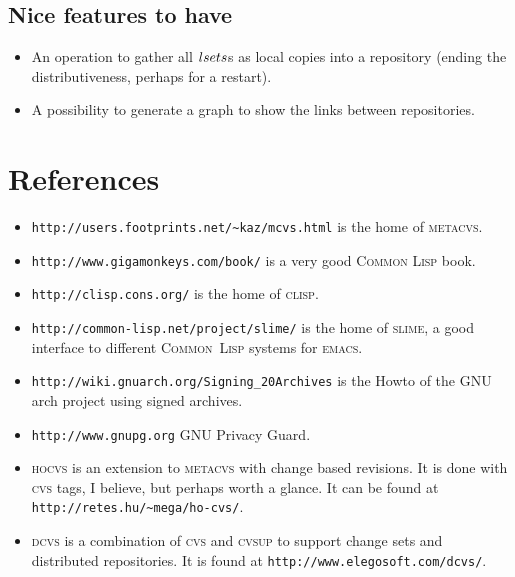 \documentclass[fleqn, 10pt, a4paper]{article}
\begin{document}
\subsection{Nice features to have}

\begin{itemize}
\item An operation to gather all $\mathnormal{lsets}$s as
local copies into a repository (ending the distributiveness, perhaps
for a restart).
\item A possibility to generate a graph to show the links between
repositories.
\end{itemize}

\section{References}

\begin{itemize}
\item \texttt{http://users.footprints.net/\textasciitilde{}kaz/mcvs.html} is the home of
\textsc{metacvs}.
\item \texttt{http://www.gigamonkeys.com/book/} is a very good
\textsc{Common Lisp} book.
\item \texttt{http://clisp.cons.org/} is the home of \textsc{clisp}.
\item \texttt{http://common-lisp.net/project/slime/} is the home of
\textsc{slime}, a good interface to different \textsc{Common~Lisp}
systems for \textsc{emacs}.
\item \texttt{http://wiki.gnuarch.org/Signing\_20Archives} is the Howto of the
GNU arch project using signed archives.
\item \texttt{http://www.gnupg.org} GNU Privacy Guard.
\item \textsc{hocvs} is an extension to \textsc{metacvs} with change based
revisions. It is done with \textsc{cvs} tags, I believe, but perhaps worth a
glance. It can be found at \texttt{http://retes.hu/\textasciitilde{}mega/ho-cvs/}.
\item \textsc{dcvs} is a combination of \textsc{cvs} and \textsc{cvsup}
to support change sets and distributed repositories. It is found
at \texttt{http://www.elegosoft.com/dcvs/}.
\end{itemize}
\end{document}
